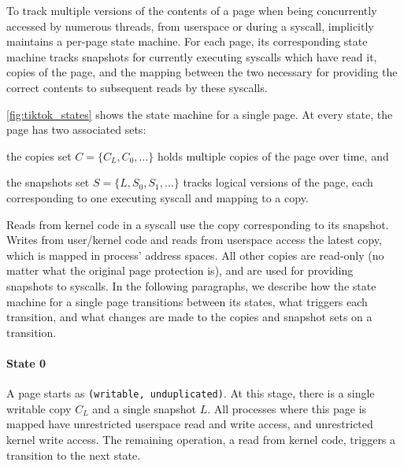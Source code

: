 \documentclass[letterpaper,twocolumn,10pt, anonymous]{article}
\begin{document}
To track multiple versions of the contents of a page when being concurrently 
accessed by numerous threads, from userspace or during a syscall,
\tiktok implicitly maintains a per-page state machine.
For each page, its corresponding state machine tracks snapshots for currently 
executing syscalls which have read it, copies of the page, and the mapping 
between the two necessary for providing the correct contents to subsequent reads 
by these syscalls.

\autoref{fig:tiktok_states} shows the state machine for a single page.
At every state, the page has two associated sets:
\begin{inparaenum}
  \item the copies set $C = \{C_L, C_0, \dots\}$ holds multiple copies of the page over time, and
  \item the snapshots set $S = \{L, S_0, S_1, \dots\}$ tracks logical versions of the page, each corresponding to one executing syscall and mapping to a copy. 
\end{inparaenum}
Reads from kernel code in a syscall use the copy corresponding to its snapshot.
Writes from user/kernel code and reads from userspace access the latest 
copy, which is mapped in process' address spaces.
All other copies are read-only (no matter what the original page protection is), and are used for providing snapshots to syscalls.
In the following paragraphs, we describe how the state machine for a single page 
transitions between its states, what triggers each transition, and what 
changes are made to the copies and snapshot sets on a transition.

\paragraph{State 0}
A page starts as \texttt{(writable, unduplicated)}.
At this stage, there is a single writable  copy $C_L$ and a single snapshot $L$. 
All processes where this page is mapped have unrestricted userspace read and write 
access, and unrestricted kernel write access.
The remaining operation, a read from kernel code, triggers a transition to 
the next state.
\end{document}
